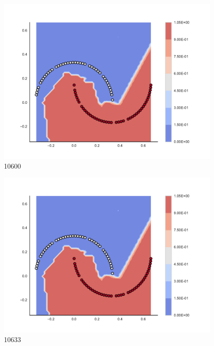 \begin{subfigure}[b]{0.09\textwidth}
    \includegraphics[clip, trim=2.35cm 1.75cm 4.5cm 0cm,width=\textwidth]{img/convergence/10600.pdf}
    \caption{10600}
    \label{fig:convergence_10600}
\end{subfigure}
%
\begin{subfigure}[b]{0.09\textwidth}
    \includegraphics[clip, trim=2.35cm 1.75cm 4.5cm 0cm,width=\textwidth]{img/convergence/10633.pdf}
    \caption{10633}
    \label{fig:convergence_10633}
\end{subfigure}
%
